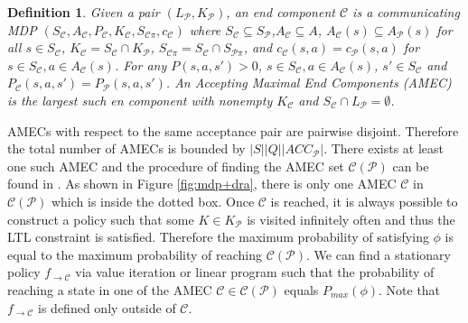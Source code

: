 \documentclass[journal]{IEEEtran}
\newtheorem{definition}{Definition}
\begin{document}
\begin{definition}\cite{ding2014optimal}
	Given a pair $(L_\mathcal{P},K_{\mathcal{P}})$, an end component $\mathcal{C}$ is a communicating MDP $(S_\mathcal{C},A_\mathcal{C},P_{\mathcal{C}},K_\mathcal{C},S_{\mathcal{C}\pi},c_{\mathcal{C}})$ where $S_\mathcal{C}\subseteq S_\mathcal{P}$,$A_\mathcal{C}\subseteq A$, $A_\mathcal{C}(s)\subseteq A_\mathcal{P}(s)$ for all $s\in S_\mathcal{C}$, $K_\mathcal{C}=S_\mathcal{C}\cap K_\mathcal{P}$, $S_{\mathcal{C}\pi} = S_\mathcal{C}\cap S_{\mathcal{P}\pi}$, and $c_{\mathcal{C}}(s,a)= c_{\mathcal{P}}(s,a)$ for $s\in S_\mathcal{C},a\in A_\mathcal{C}(s)$. For any $P(s,a,s')>0$, $s\in S_\mathcal{C},a\in A_\mathcal{C}(s)$, $s'\in S_\mathcal{C}$ and $P_\mathcal{C}(s,a,s')=P_\mathcal{P}(s,a,s')$. An Accepting Maximal End Components (AMEC) is the largest such en component with  nonempty $K_\mathcal{C}$ and $S_\mathcal{C}\cap L_\mathcal{P}=\emptyset$.
\end{definition}

AMECs with respect to the same acceptance pair are pairwise disjoint. Therefore the total number of AMECs is bounded by $|S||Q||ACC_\mathcal{P}|$. There exists at least one such AMEC and the procedure of finding the AMEC set $\mathcal{C}(\mathcal{P})$ can be found in \cite{baier2008principles}. As shown in  Figure \ref{fig:mdp+dra}, there is only one AMEC $\mathcal{C}$ in $\mathcal{C}(\mathcal{P})$ which is inside the dotted box. Once $\mathcal{C}$ is reached, it is always possible to construct a policy such that some $K\in K_{\mathcal{P}}$ is visited infinitely often and thus the LTL constraint is satisfied. Therefore the maximum probability of satisfying $\phi$ is equal to the maximum probability of reaching $\mathcal{C}(\mathcal{P})$. We can find a stationary policy $f_{\rightarrow\mathcal{C}}$ via value iteration or linear program such that the probability of reaching a state in one of the AMEC $\mathcal{C}\in\mathcal{C}(\mathcal{P})$  equals $P_{max}(\phi)$. Note that $f_{\rightarrow\mathcal{C}}$ is defined only outside of $\mathcal{C}$.
%
%	
\end{document}

